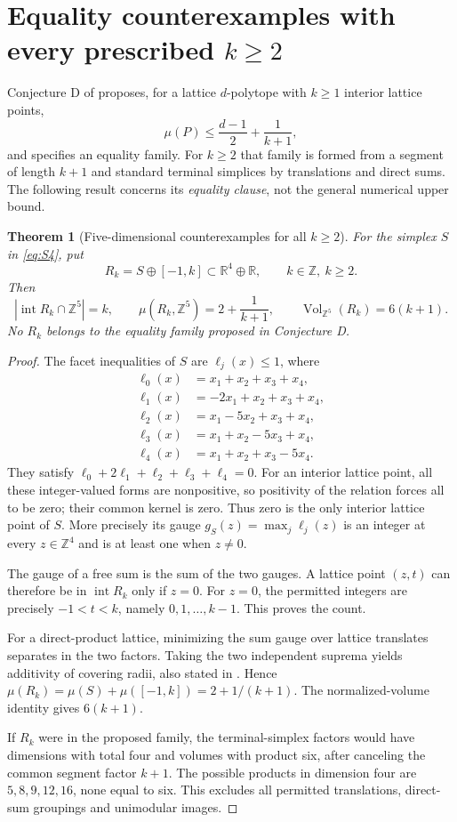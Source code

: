 \documentclass[11pt,a4paper]{article}
\newtheorem{theorem}{Theorem}[section]
\theoremstyle{remark}
\DeclareMathOperator{\Vol}{Vol}
\DeclareMathOperator{\inter}{int}
\newcommand{\R}{\mathbb R}\newcommand{\Z}{\mathbb Z}
\begin{document}
\section{Equality counterexamples with every prescribed \texorpdfstring{$k\ge2$}{k >= 2}}
Conjecture D of \cite{CSS} proposes, for a lattice $d$-polytope with
$k\ge1$ interior lattice points,
\[
 \mu(P)\le\frac{d-1}{2}+\frac1{k+1},
\]
and specifies an equality family. For $k\ge2$ that family is formed
from a segment of length $k+1$ and standard terminal simplices by
translations and direct sums. The following result concerns its
\emph{equality clause}, not the general numerical upper bound.

\begin{theorem}[Five-dimensional counterexamples for all $k\ge2$]
\label{thm:D}
For the simplex $S$ in \eqref{eq:S4}, put
\[
 R_k=S\oplus[-1,k]\subset\R^4\oplus\R,\qquad k\in\Z,\ k\ge2.
\]
Then
\[
 |\inter R_k\cap\Z^5|=k,\qquad
 \mu(R_k,\Z^5)=2+\frac1{k+1},\qquad
 \Vol_{\Z^5}(R_k)=6(k+1).
\]
No $R_k$ belongs to the equality family proposed in Conjecture D.
\end{theorem}
\begin{proof}
The facet inequalities of $S$ are $\ell_j(x)\le1$, where
\begin{align*}
 \ell_0(x)&=x_1+x_2+x_3+x_4,\\
 \ell_1(x)&=-2x_1+x_2+x_3+x_4,\\
 \ell_2(x)&=x_1-5x_2+x_3+x_4,\\
 \ell_3(x)&=x_1+x_2-5x_3+x_4,\\
 \ell_4(x)&=x_1+x_2+x_3-5x_4.
\end{align*}
They satisfy $\ell_0+2\ell_1+\ell_2+\ell_3+\ell_4=0$.
For an interior lattice point, all these integer-valued forms are
nonpositive, so positivity of the relation forces all to be zero;
their common kernel is zero. Thus zero is the only interior lattice
point of $S$. More precisely its gauge
$g_S(z)=\max_j\ell_j(z)$ is an integer at every $z\in\Z^4$ and
is at least one when $z\ne0$.

The gauge of a free sum is the sum of the two gauges. A lattice point
$(z,t)$ can therefore be in $\inter R_k$ only if $z=0$. For $z=0$,
the permitted integers are precisely $-1<t<k$, namely
$0,1,\ldots,k-1$. This proves the count.

For a direct-product lattice, minimizing the sum gauge over lattice
translates separates in the two factors. Taking the two independent
suprema yields additivity of covering radii, also stated in
\cite[Corollary 2.2]{CSS}. Hence
$\mu(R_k)=\mu(S)+\mu([-1,k])=2+1/(k+1)$.
The normalized-volume identity gives $6(k+1)$.

If $R_k$ were in the proposed family, the terminal-simplex factors
would have dimensions with total four and volumes with product six,
after canceling the common segment factor $k+1$. The possible
products in dimension four are $5,8,9,12,16$, none equal to six.
This excludes all permitted translations, direct-sum groupings and
unimodular images.
\end{proof}
\end{document}
